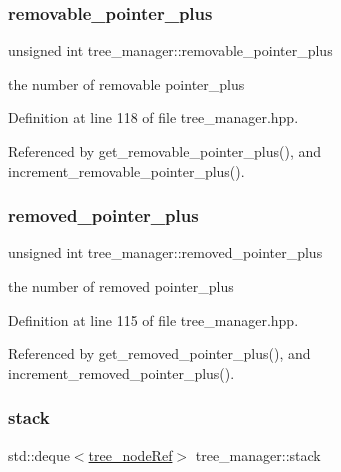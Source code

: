 \subsubsection{\texorpdfstring{removable\+\_\+pointer\+\_\+plus}{removable\_pointer\_plus}}
{\footnotesize\ttfamily unsigned int tree\+\_\+manager\+::removable\+\_\+pointer\+\_\+plus\hspace{0.3cm}{\ttfamily [private]}}



the number of removable pointer\+\_\+plus 



Definition at line 118 of file tree\+\_\+manager.\+hpp.



Referenced by get\+\_\+removable\+\_\+pointer\+\_\+plus(), and increment\+\_\+removable\+\_\+pointer\+\_\+plus().

\mbox{\label{classtree__manager_a61c78fb4ece86e5178a6034f5c158b47}} 
\subsubsection{\texorpdfstring{removed\+\_\+pointer\+\_\+plus}{removed\_pointer\_plus}}
{\footnotesize\ttfamily unsigned int tree\+\_\+manager\+::removed\+\_\+pointer\+\_\+plus\hspace{0.3cm}{\ttfamily [private]}}



the number of removed pointer\+\_\+plus 



Definition at line 115 of file tree\+\_\+manager.\+hpp.



Referenced by get\+\_\+removed\+\_\+pointer\+\_\+plus(), and increment\+\_\+removed\+\_\+pointer\+\_\+plus().

\mbox{\label{classtree__manager_a646fa07ed16636dfd498f6d2043eb63d}} 
\subsubsection{\texorpdfstring{stack}{stack}}
{\footnotesize\ttfamily std\+::deque$<$\hyperlink{tree__node_8hpp_a6ee377554d1c4871ad66a337eaa67fd5}{tree\+\_\+node\+Ref}$>$ tree\+\_\+manager\+::stack\hspace{0.3cm}{\ttfamily [private]}}



